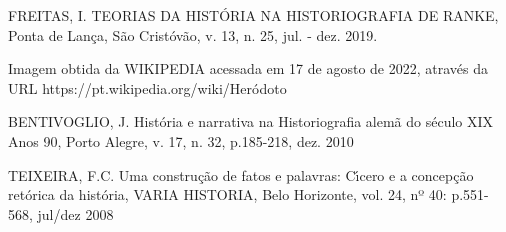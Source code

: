 \documentclass[
12pt,		%
openright,	%
twoside,  %
a4paper,			%
chapter=TITLE,		%
english,			%
french,				%
spanish,			%
brazil				%
]{USPSC-classe/USPSC}
\begin{document}
\begin{flushleft}
\begin{flushleft}
\begin{flushleft}
\begin{flushleft}
[FREITAS, 2019] FREITAS, I. TEORIAS DA HIST\'ORIA NA HISTORIOGRAFIA DE RANKE, Ponta de Lan\c{c}a, S\~ao Crist\'ov\~ao, v. 13, n. 25, jul. - dez. 2019.
\end{flushleft}


\end{flushleft}


\end{flushleft}


\end{flushleft}


\begin{flushleft}
\begin{flushleft}
\begin{flushleft}
\begin{flushleft}
[WIKIPEDIA, 2022] Imagem obtida da WIKIPEDIA acessada em 17 de agosto de 2022, atrav\'es da URL https://pt.wikipedia.org/wiki/Her\'odoto
\end{flushleft}


\end{flushleft}


\end{flushleft}


\end{flushleft}


\begin{flushleft}
\begin{flushleft}
\begin{flushleft}
\begin{flushleft}
[BENTIVOGLIO, 2010] BENTIVOGLIO, J. Hist\'oria e narrativa na Historiografia alem\~a do s\'eculo XIX Anos 90, Porto Alegre, v. 17, n. 32, p.185-218, dez. 2010
\end{flushleft}


\end{flushleft}


\end{flushleft}


\end{flushleft}


\begin{flushleft}
\begin{flushleft}
\begin{flushleft}
\begin{flushleft}
[TEIXEIRA, 2008] TEIXEIRA, F.C. Uma constru\c{c}\~ao de fatos e palavras: C\'{\i}cero e a concep\c{c}\~ao ret\'orica da hist\'oria, VARIA HISTORIA, Belo Horizonte, vol. 24, nº 40: p.551-568, jul/dez 2008
\end{flushleft}


\end{flushleft}


\end{flushleft}


\end{flushleft}
\end{document}
